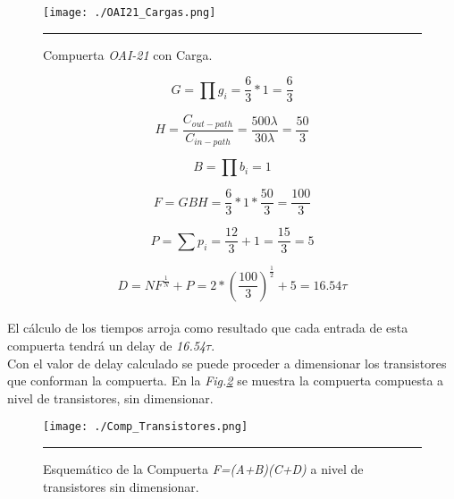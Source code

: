 \documentclass[12pt,a4paper]{article} %
\begin{document}
\begin{figure}[htbp]
  \centering
    \texttt{[image: ./OAI21\_Cargas.png]}
    \rule{35em}{0.5pt}
  \caption[IdealvsSim]{Compuerta \textit{OAI-21} con Carga.}
  \label{fig:OAI21_Cargas}
\end{figure}


\begin{equation}\label{eqn:esfuerzo_logico2}
G= \prod g_{i}= \frac{6}{3} * 1 = \frac{6}{3}
\end{equation}

\begin{equation}\label{eqn:esfuerzo_electrico2}
H= \frac{C_{out-path}}{C_{in-path}} = \frac{500\lambda}{30\lambda} = \frac{50}{3}
\end{equation}

\begin{equation}\label{eqn:esfuerzo_enramado2}
B= \prod b_{i} = 1
\end{equation}

\begin{equation}\label{eqn:esfuerzo2}
F = GBH = \frac{6}{3}*1*\frac{50}{3} = \frac{100}{3}
\end{equation}

\begin{equation}\label{eqn:delay_parasitico2}
P = \sum p_{i} = \frac{12}{3} + 1 = \frac{15}{3} = 5
\end{equation}

\begin{equation}\label{eqn:delay2}
D = NF^{\frac{1}{N}} + P = 2*(\frac{100}{3})^{\frac{1}{2}} + 5 = 16.54\tau
\end{equation}\\

El cálculo de los tiempos arroja como resultado que cada entrada de esta compuerta tendrá un delay de \textit{16.54$\tau$}.\\

Con el valor de delay calculado se puede proceder a dimensionar los transistores que conforman la compuerta. En la \textit{Fig.\ref{fig:Comp_Transistores}} se muestra la compuerta compuesta a nivel de transistores, sin dimensionar.\\

\begin{figure}[htbp]
  \centering
    \texttt{[image: ./Comp\_Transistores.png]}
    \rule{35em}{0.5pt}
  \caption[IdealvsSim]{Esquemático de la Compuerta \textit{F=(A+B)(C+D)} a nivel de transistores sin dimensionar.}
  \label{fig:Comp_Transistores}
\end{figure}
\end{document}
